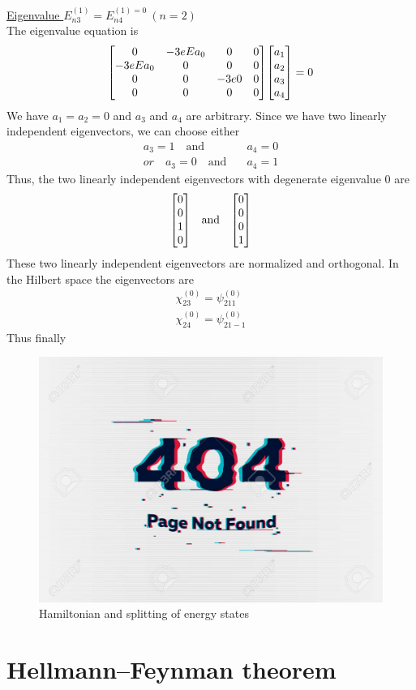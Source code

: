 		
		
		\underline{Eigenvalue $E_{n 3}^{(1)} = E_{n 4}^{(1)= 0} \ (n=2)$}\\
		The eigenvalue equation is
		\begin{equation*}
			\mqty[0 & - 3 e E a_0 & 0 & 0 \\
			-3 e E a_0 & 0 & 0 & 0\\
			0 & 0 & -3 e 0 & 0\\
			0 & 0 & 0 & 0
			]\mqty[a_1 \\ a_2 \\ a_3 \\ a_4] = 0
		\end{equation*}
		We have $ a_1 = a_2 = 0$ and $a_3$ and $a_4$ are arbitrary. Since we have two linearly independent eigenvectors, we can choose either
		\begin{align*}
			a_3 = 1 \quad \text{and} &\quad a_4 = 0 \\
			or\quad 			a_3 = 0 \quad \text{and} &\quad a_4 = 1
		\end{align*}
		Thus, the two linearly independent eigenvectors with degenerate eigenvalue $0$ are
		\begin{equation*}
			\mqty[0 \\ 0 \\ 1 \\ 0] \quad \text{and} \quad \mqty[0 \\ 0 \\ 0 \\ 1]
		\end{equation*}
		These two linearly independent eigenvectors are normalized and orthogonal. In the Hilbert space the eigenvectors are
		\begin{align*}
		\chi_{2 3}^{(0)} = \psi_{2 1 1}^{(0)}			\\
		\chi_{2 4}^{(0)} = \psi_{2 1 -1}^{(0)}
		\end{align*}
		Thus finally
		
		\begin{figure}
			\centering
			\includegraphics[width=0.5\linewidth]{Pictures/not-found.jpg}
			\caption{Hamiltonian and splitting of energy states}
		\end{figure}


	\section{Hellmann–Feynman theorem}
	


